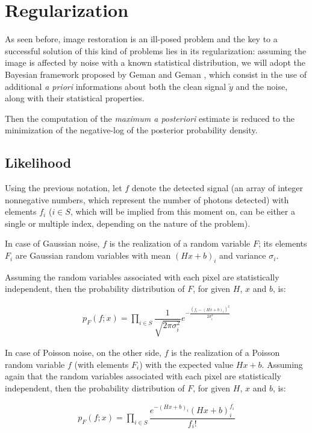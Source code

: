 \section{Regularization}

As seen before, image restoration is an ill-posed problem and the key to a successful solution of this kind of problems lies in its regularization: assuming the image is affected by noise with a known statistical distribution, we will adopt the Bayesian framework proposed by Geman and Geman \citep{bayes}, which consist in the use of additional \emph{a priori} informations about both the clean signal $\tilde{y}$ and the noise, along with their statistical properties.

Then the computation of the \emph{maximum a posteriori} estimate is reduced to the minimization of the negative-log of the posterior probability density.

\subsection{Likelihood}

Using the previous notation, let $f$ denote the detected signal (an array of integer nonnegative numbers, which represent the number of photons detected) with elements $f_i$ ($i \in S$, which will be implied from this moment on, can be either a single or multiple index, depending on the nature of the problem).

In case of Gaussian noise, $f$ is the realization of a random variable $F$; its elements $F_i$ are Gaussian random variables with mean $(Hx+b)_i$ and variance $\sigma_i$.

Assuming the random variables associated with each pixel are statistically independent, then the probability distribution of $F$, for given $H$, $x$ and $b$, is:

\begin{align}
\label{g_like}
p_F(f;x) = \prod_{i \in S} \dfrac{1}{\sqrt{2\pi\sigma_i^2}} e^{-\frac{(f_i-(Hx+b)_i)^2}{2\sigma_i^2}}
\end{align}

In case of Poisson noise, on the other side, $f$ is the realization of a Poisson random variable $f$ (with elements $F_i$) with the expected value $Hx+b$. Assuming again that the random variables associated with each pixel are statistically independent, then the probability distribution of $F$, for given $H$, $x$ and $b$, is:

\begin{align}
\label{p_like}
p_F(f;x) = \prod_{i \in S} \dfrac{e^{-(Hx+b)_i} (Hx+b)_i^{f_i}}{f_i!}
\end{align}

